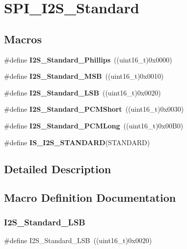 \section{S\+P\+I\+\_\+\+I2\+S\+\_\+\+Standard}
\label{group__SPI__I2S__Standard}
\subsection*{Macros}
\begin{DoxyCompactItemize}
\item 
\#define \textbf{ I2\+S\+\_\+\+Standard\+\_\+\+Phillips}~((uint16\+\_\+t)0x0000)
\item 
\#define \textbf{ I2\+S\+\_\+\+Standard\+\_\+\+M\+SB}~((uint16\+\_\+t)0x0010)
\item 
\#define \textbf{ I2\+S\+\_\+\+Standard\+\_\+\+L\+SB}~((uint16\+\_\+t)0x0020)
\item 
\#define \textbf{ I2\+S\+\_\+\+Standard\+\_\+\+P\+C\+M\+Short}~((uint16\+\_\+t)0x0030)
\item 
\#define \textbf{ I2\+S\+\_\+\+Standard\+\_\+\+P\+C\+M\+Long}~((uint16\+\_\+t)0x00\+B0)
\item 
\#define \textbf{ I\+S\+\_\+\+I2\+S\+\_\+\+S\+T\+A\+N\+D\+A\+RD}(S\+T\+A\+N\+D\+A\+RD)
\end{DoxyCompactItemize}


\subsection{Detailed Description}


\subsection{Macro Definition Documentation}
\mbox{\label{group__SPI__I2S__Standard_ga88bc9001a13b95a0844d81fea2080df6}} 
\subsubsection{I2\+S\+\_\+\+Standard\+\_\+\+L\+SB}
{\footnotesize\ttfamily \#define I2\+S\+\_\+\+Standard\+\_\+\+L\+SB~((uint16\+\_\+t)0x0020)}



